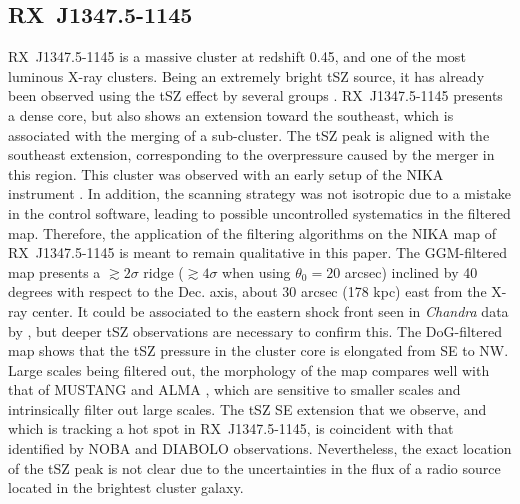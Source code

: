 \documentclass[traditabstract]{aa}
\begin{document}
\subsection{RX~J1347.5-1145}\label{sec:RXJ1347.5-1145}
\mbox{RX~J1347.5-1145} is a massive cluster at redshift 0.45, and one of the most luminous X-ray clusters. Being an extremely bright tSZ source, it has already been observed using the tSZ effect by several groups \citep[e.g.,][]{Komatsu1999,Pointecouteau1999,Kitayama2004,Mason2010,Plagge2012,Adam2014,Sayers2016,Kitayama2016}. \mbox{RX~J1347.5-1145} presents a dense core, but also shows an extension toward the southeast, which is associated with the merging of a sub-cluster. The tSZ peak is aligned with the southeast extension, corresponding to the overpressure caused by the merger in this region. This cluster was observed with an early setup of the NIKA instrument \citep[bandpass, sensitivity, calibration procedure; see][for more details]{Adam2014}. In addition, the scanning strategy was not isotropic due to a mistake in the control software, leading to possible uncontrolled systematics in the filtered map. Therefore, the application of the filtering algorithms on the NIKA map of \mbox{RX~J1347.5-1145} is meant to remain qualitative in this paper. The GGM-filtered map presents a $\gtrsim 2 \sigma$ ridge ($\gtrsim 4 \sigma$ when using $\theta_0 = 20$ arcsec) inclined by 40 degrees with respect to the Dec. axis, about 30 arcsec (178 kpc) east from the X-ray center. It could be associated to the eastern shock front seen in \textit{Chandra} data by \cite{Kreisch2016}, but deeper tSZ observations are necessary to confirm this. The DoG-filtered map shows that the tSZ pressure in the cluster core is elongated from SE to NW. Large scales being filtered out, the morphology of the map compares well with that of MUSTANG \citep{Mason2010} and ALMA \citep{Kitayama2016}, which are sensitive to smaller scales and intrinsically filter out large scales. The tSZ SE extension that we observe, and which is tracking a hot spot in \mbox{RX~J1347.5-1145}, is coincident with that identified by NOBA \citep[Nobeyama Bolometer Array][]{Kitayama2004} and DIABOLO \citep[on the IRAM 30m telescope][]{Pointecouteau1999,Pointecouteau2001} observations. Nevertheless, the exact location of the tSZ peak is not clear due to the uncertainties in the flux of a radio source located in the brightest cluster galaxy.

\end{document}
